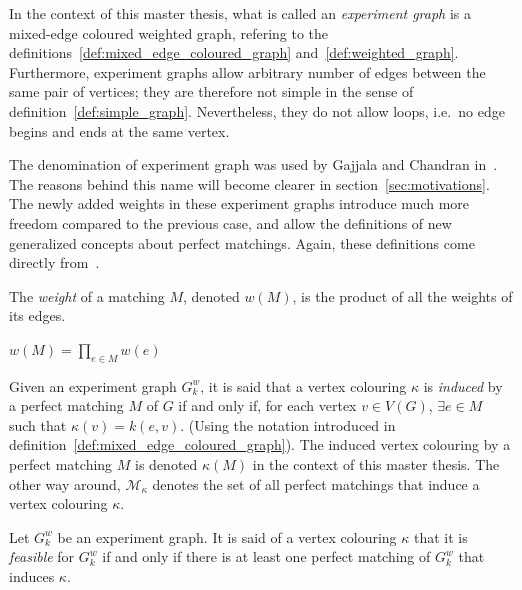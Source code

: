 \begin{definition}
    \label{def:experiment_graph}
    In the context of this master thesis, what is called an \textit{experiment graph} is a mixed-edge coloured weighted graph, refering to the definitions~\ref{def:mixed_edge_coloured_graph} and~\ref{def:weighted_graph}.
    Furthermore, experiment graphs allow arbitrary number of edges between the same pair of vertices; they are therefore not simple in the sense of definition~\ref{def:simple_graph}.
    Nevertheless, they do not allow loops, i.e.\ no edge begins and ends at the same vertex.
\end{definition}

The denomination of experiment graph was used by Gajjala and Chandran in~\cite{chandran2023graphtheoretic}.
The reasons behind this name will become clearer in section~\ref{sec:motivations}.
The newly added weights in these experiment graphs introduce much more freedom compared to the previous case, and allow the definitions of new generalized concepts about perfect matchings.
Again, these definitions come directly from~\cite{wordpress}.

\begin{definition}
    \label{def:matching_weight}
    The \textit{weight} of a matching $M$, denoted $w(M)$, is the product of all the weights of its edges.
    \begin{center}
        $w(M) = \prod\limits_{e \in M}w(e)$
    \end{center}
\end{definition}

\begin{definition}
    \label{def:induced_vertex_colouring}
    Given an experiment graph $G_k^w$, it is said that a vertex colouring $\kappa$ is \textit{induced} by a perfect matching $M$ of $G$ if and only if, for each vertex $v \in V(G)$, $\exists e \in M$ such that $\kappa(v) = k(e, v)$.
    (Using the notation introduced in definition~\ref{def:mixed_edge_coloured_graph}).
    The induced vertex colouring by a perfect matching $M$ is denoted $\kappa(M)$ in the context of this master thesis.
    The other way around, $\mathcal{M}_\kappa$ denotes the set of all perfect matchings that induce a vertex colouring $\kappa$.
\end{definition}

\begin{definition}
    \label{def:feasible_vertex_colouring}
    Let $G_k^w$ be an experiment graph.
    It is said of a vertex colouring $\kappa$ that it is \textit{feasible} for $G_k^w$ if and only if there is at least one perfect matching of $G_k^w$ that induces $\kappa$.
\end{definition}

